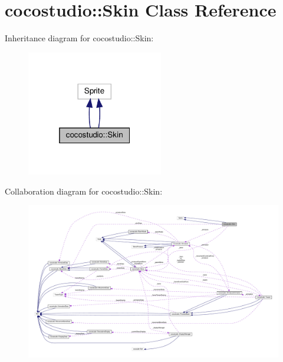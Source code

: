 \hypertarget{classcocostudio_1_1Skin}{}\section{cocostudio\+:\+:Skin Class Reference}
\label{classcocostudio_1_1Skin}


Inheritance diagram for cocostudio\+:\+:Skin\+:
\nopagebreak
\begin{figure}[H]
\begin{center}
\leavevmode
\includegraphics[width=169pt]{classcocostudio_1_1Skin__inherit__graph}
\end{center}
\end{figure}


Collaboration diagram for cocostudio\+:\+:Skin\+:
\nopagebreak
\begin{figure}[H]
\begin{center}
\leavevmode
\includegraphics[width=350pt]{classcocostudio_1_1Skin__coll__graph}
\end{center}
\end{figure}
